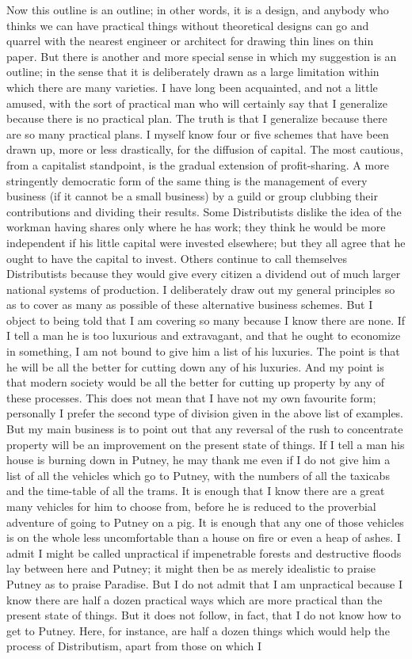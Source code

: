 \documentclass{book}
\begin{document}
Now this outline is an outline; in other words, it is a design, and anybody who thinks we can have practical things without theoretical designs can go and quarrel with the nearest engineer or architect for drawing thin lines on thin paper. But there is another and more special sense in which my suggestion is an outline; in the sense that it is deliberately drawn as a large limitation within which there are many varieties. I have long been acquainted, and not a little amused, with the sort of practical man who will certainly say that I generalize because there is no practical plan. The truth is that I generalize because there are so many practical plans. I myself know four or five schemes that have been drawn up, more or less drastically, for the diffusion of capital. The most cautious, from a capitalist standpoint, is the gradual extension of profit-sharing. A more stringently democratic form of the same thing is the management of every business (if it cannot be a small business) by a guild or group clubbing their contributions and dividing their results. Some Distributists dislike the idea of the workman having shares only where he has work; they think he would be more independent if his little capital were invested elsewhere; but they all agree that he ought to have the capital to invest. Others continue to call themselves Distributists because they would give every citizen a dividend out of much larger national systems of production. I deliberately draw out my general principles so as to cover as many as possible of these alternative business schemes. But I object to being told that I am covering so many because I know there are none. If I tell a man he is too luxurious and extravagant, and that he ought to economize in something, I am not bound to give him a list of his luxuries. The point is that he will be all the better for cutting down any of his luxuries. And my point is that modern society would be all the better for cutting up property by any of these processes. This does not mean that I have not my own favourite form; personally I prefer the second type of division given in the above list of examples. But my main business is to point out that any reversal of the rush to concentrate property will be an improvement on the present state of things. If I tell a man his house is burning down in Putney, he may thank me even if I do not give him a list of all the vehicles which go to Putney, with the numbers of all the taxicabs and the time-table of all the trams. It is enough that I know there are a great many vehicles for him to choose from, before he is reduced to the proverbial adventure of going to Putney on a pig. It is enough that any one of those vehicles is on the whole less uncomfortable than a house on fire or even a heap of ashes. I admit I might be called unpractical if impenetrable forests and destructive floods lay between here and Putney; it might then be as merely idealistic to praise Putney as to praise Paradise. But I do not admit that I am unpractical because I know there are half a dozen practical ways which are more practical than the present state of things. But it does not follow, in fact, that I do not know how to get to Putney. Here, for instance, are half a dozen things which would help the process of Distributism, apart from those on which I 
\end{document}
